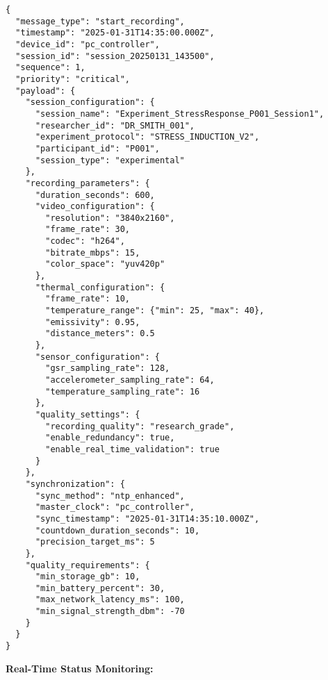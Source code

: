 \documentclass[12pt,a4paper]{article}
\begin{document}
\begin{verbatim}
{
  "message_type": "start_recording",
  "timestamp": "2025-01-31T14:35:00.000Z",
  "device_id": "pc_controller",
  "session_id": "session_20250131_143500",
  "sequence": 1,
  "priority": "critical",
  "payload": {
    "session_configuration": {
      "session_name": "Experiment_StressResponse_P001_Session1",
      "researcher_id": "DR_SMITH_001",
      "experiment_protocol": "STRESS_INDUCTION_V2",
      "participant_id": "P001",
      "session_type": "experimental"
    },
    "recording_parameters": {
      "duration_seconds": 600,
      "video_configuration": {
        "resolution": "3840x2160",
        "frame_rate": 30,
        "codec": "h264",
        "bitrate_mbps": 15,
        "color_space": "yuv420p"
      },
      "thermal_configuration": {
        "frame_rate": 10,
        "temperature_range": {"min": 25, "max": 40},
        "emissivity": 0.95,
        "distance_meters": 0.5
      },
      "sensor_configuration": {
        "gsr_sampling_rate": 128,
        "accelerometer_sampling_rate": 64,
        "temperature_sampling_rate": 16
      },
      "quality_settings": {
        "recording_quality": "research_grade",
        "enable_redundancy": true,
        "enable_real_time_validation": true
      }
    },
    "synchronization": {
      "sync_method": "ntp_enhanced",
      "master_clock": "pc_controller",
      "sync_timestamp": "2025-01-31T14:35:10.000Z",
      "countdown_duration_seconds": 10,
      "precision_target_ms": 5
    },
    "quality_requirements": {
      "min_storage_gb": 10,
      "min_battery_percent": 30,
      "max_network_latency_ms": 100,
      "min_signal_strength_dbm": -70
    }
  }
}
\end{verbatim}

\textbf{Real-Time Status Monitoring:}
\end{document}
